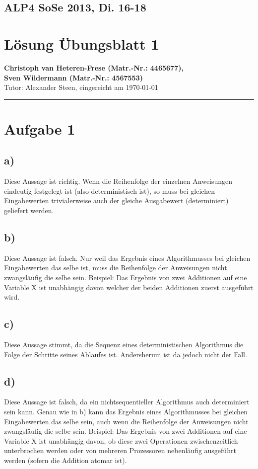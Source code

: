 \documentclass[11pt,a4paper,DIV=10,]{scrartcl}
\begin{document}
\onecolumn
\subsection*{ALP4 SoSe 2013, Di. 16-18}
\section*{Lösung Übungsblatt 1}
\textbf{Christoph van Heteren-Frese (Matr.-Nr.: 4465677), \\ Sven Wildermann (Matr.-Nr.: 4567553)}\\
Tutor: Alexander Steen, eingereicht am \today\\
\hrule

\section*{Aufgabe 1}
\subsection*{a)}
Diese Aussage ist richtig. Wenn die Reihenfolge der einzelnen Anweisungen eindeutig festgelegt ist (also deterministisch ist), so muss bei gleichen Eingabewerten trivialerweise auch der gleiche Ausgabewert (determiniert) geliefert  werden. 
\subsection*{b)}
Diese Aussage ist falsch. Nur weil das Ergebnis eines Algorithmusses bei gleichen Eingabewerten das selbe ist, muss die Reihenfolge der Anweisungen
nicht zwangsläufig die selbe sein. Beispiel: Das Ergebnis von zwei Additionen auf eine Variable X ist unabhängig davon welcher der beiden Additionen
zuerst ausgeführt wird. 
\subsection*{c)}
Diese Aussage stimmt, da die Sequenz eines deterministischen Algorithmus die Folge der Schritte seines Ablaufes ist. Andersherum ist da jedoch nicht der Fall. 
\subsection*{d)}
Diese Aussage ist falsch, da ein nichtsequentieller Algorithmus auch determiniert sein kann. 
Genau wie in b) kann das Ergebnis eines Algorithmusses bei gleichen Eingabewerten das selbe sein, auch wenn die Reihenfolge der Anweisungen
nicht zwangsläufig die selbe sein. Beispiel: Das Ergebnis von zwei Additionen auf eine Variable X ist unabhängig davon, ob diese zwei Operationen
zwischenzeitlich unterbrochen werden oder von mehreren Prozessoren nebenläufig ausgeführt werden (sofern die Addition atomar ist). 
\end{document}
